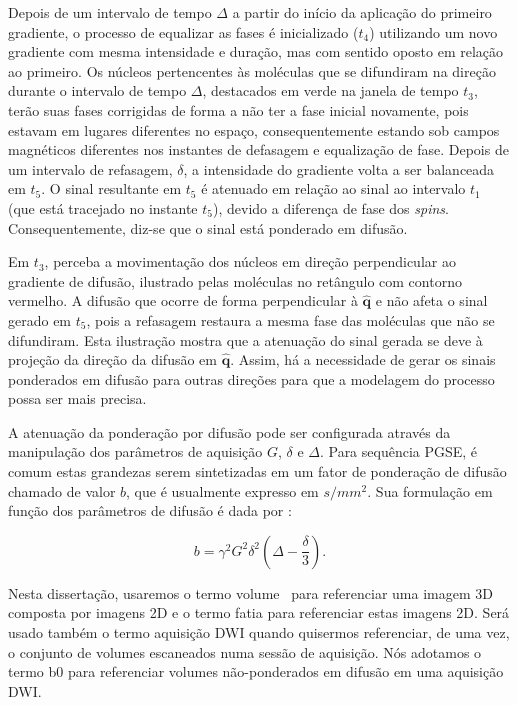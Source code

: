 \documentclass[
    12pt,                %
    oneside,            %
    a4paper,            %
    english,            %
    french,                %
    spanish,            %
    brazil                %
    ]{abntex2}
\begin{document}
Depois de um intervalo de tempo $\Delta$ a partir do início da aplicação do primeiro gradiente, o processo de equalizar as fases é inicializado ($t_4$) utilizando um novo gradiente com mesma intensidade e duração, mas com sentido oposto em relação ao primeiro. Os núcleos pertencentes às moléculas que se difundiram na direção durante o intervalo de tempo $\Delta$, destacados em verde na janela de tempo $t_3$, terão suas fases corrigidas de forma a não ter a fase inicial novamente, pois estavam em lugares diferentes no espaço, consequentemente estando sob campos magnéticos diferentes nos instantes de defasagem e equalização de fase. Depois de um intervalo de refasagem, $\delta$, a intensidade do gradiente volta a ser balanceada em $t_5$.
O sinal resultante em $t_5$ é atenuado em relação ao sinal ao intervalo $t_1$ (que está tracejado no instante $t_5$), devido a diferença de fase dos \textit{spins}. Consequentemente, diz-se que o sinal está ponderado em difusão.

Em $t_3$, perceba a movimentação dos núcleos em direção perpendicular ao gradiente de difusão, ilustrado pelas moléculas no retângulo com contorno vermelho. A difusão que ocorre de forma perpendicular à $\mathbf{\hat{q}}$ e não afeta o sinal gerado em $t_5$, pois a refasagem restaura a mesma fase das moléculas que não se difundiram. Esta ilustração mostra que a atenuação do sinal gerada se deve à projeção da direção da difusão em $\mathbf{\hat{q}}$. Assim, há a necessidade de gerar os sinais ponderados em difusão para outras direções para que a modelagem do processo possa ser mais precisa.

A atenuação da ponderação por difusão pode ser configurada através da manipulação dos parâmetros de aquisição  $G$,  $\delta$ e $\Delta$. Para sequência PGSE, é comum estas grandezas serem sintetizadas em um fator de ponderação de difusão chamado de valor $b$, que é usualmente expresso em $s/mm^2$. Sua formulação em função dos parâmetros de difusão é dada por \cite{DTI_Handbook}:

\begin{equation}
\label{eq::bvalue}
    b = \gamma^2G^2\delta^2(\Delta - \frac{\delta}{3}).
\end{equation}

Nesta dissertação, usaremos o termo \textsf{volume} ~para referenciar uma imagem 3D composta por imagens 2D e o termo \textsf{fatia} para referenciar estas imagens 2D. Será usado também o termo \textsf{aquisição DWI} quando quisermos referenciar, de uma vez, o conjunto de volumes escaneados numa sessão de aquisição. Nós adotamos o termo \textsf{b0}  para referenciar volumes não-ponderados em difusão em uma aquisição DWI.
\end{document}
